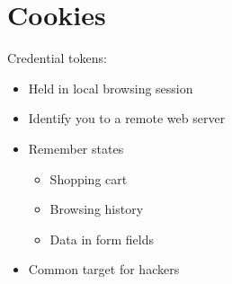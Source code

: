 \documentclass{article}[18pt]
\begin{document}
\section{Cookies}
Credential tokens:
\begin{itemize}
	\item Held in local browsing session
	\item Identify you to a remote web server
	\item Remember states
	\begin{itemize}
		\item Shopping cart
		\item Browsing history
		\item Data in form fields
	\end{itemize}
	\item Common target for hackers
\end{itemize}
\end{document}
